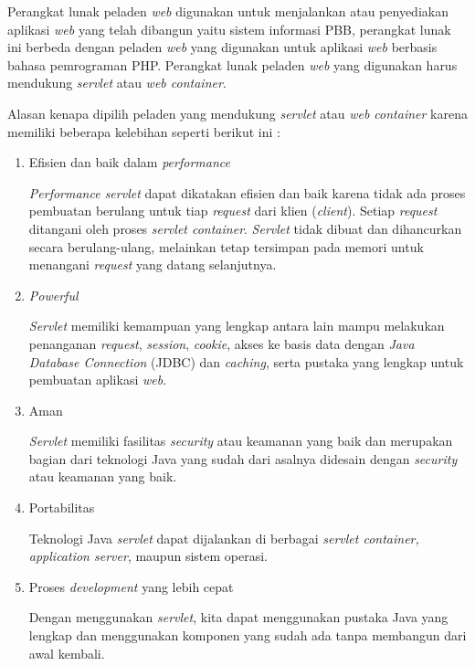 \documentclass[pdftex,12pt, oneside]{article}
\begin{document}
\begin{enumerate}
Perangkat lunak peladen \textit{web} digunakan untuk menjalankan atau penyediakan aplikasi \textit{web} yang telah dibangun yaitu sistem informasi PBB, perangkat lunak ini berbeda dengan peladen \textit{web} yang digunakan untuk aplikasi \textit{web} berbasis bahasa pemrograman PHP. Perangkat lunak peladen \textit{web} yang digunakan harus mendukung \textit{servlet} atau \textit{web container}.	

Alasan kenapa dipilih peladen yang mendukung \textit{servlet} atau \textit{web container} karena memiliki beberapa kelebihan seperti berikut ini :

	\begin{enumerate}
		\item Efisien dan baik dalam \textit{performance}
		
\textit{Performance servlet} dapat dikatakan efisien dan baik karena tidak ada proses pembuatan berulang untuk tiap \textit{request} dari klien (\textit{client}). Setiap \textit{request} ditangani oleh proses \textit{servlet container}. \textit{Servlet} tidak dibuat dan dihancurkan secara berulang-ulang, melainkan tetap tersimpan pada memori untuk menangani \textit{request} yang datang selanjutnya.
		
		\item \textit{Powerful}

\textit{Servlet} memiliki kemampuan yang lengkap antara lain mampu melakukan penanganan \textit{request}, \textit{session}, \textit{cookie}, akses ke basis data dengan \textit{Java Database Connection} (JDBC) dan \textit{caching}, serta pustaka yang lengkap untuk pembuatan aplikasi \textit{web}.
	
		\item Aman
		
\textit{Servlet} memiliki fasilitas \textit{security} atau keamanan yang baik dan merupakan bagian dari teknologi Java yang sudah dari asalnya didesain dengan \textit{security} atau keamanan yang baik.		
		
		\item Portabilitas
		
Teknologi Java \textit{servlet} dapat dijalankan di berbagai \textit{servlet container, application server}, maupun sistem operasi.		
		
		\item Proses \textit{development} yang lebih cepat
		
Dengan menggunakan \textit{servlet}, kita dapat menggunakan pustaka Java yang lengkap dan menggunakan komponen yang sudah ada tanpa membangun dari awal kembali.		
		

\end{enumerate}
\end{enumerate}
\end{document}
